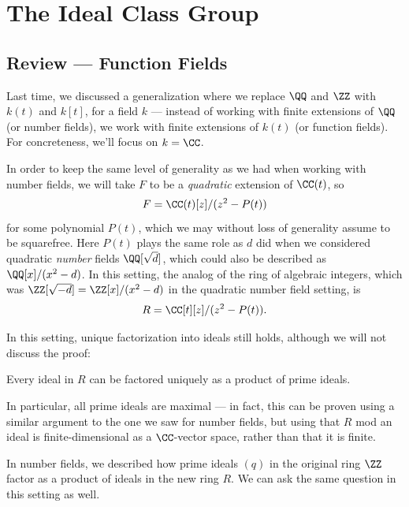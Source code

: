 

\section{The Ideal Class Group}

\subsection{Review --- Function Fields}

Last time, we discussed a generalization where we replace $\QQ$ and $\ZZ$ with $k(t)$ and $k[t]$, for a field $k$ --- instead of working with finite extensions of $\QQ$ (or number fields), we work with finite extensions of $k(t)$ (or function fields). For concreteness, we'll focus on $k = \CC$. 

In order to keep the same level of generality as we had when working with number fields, we will take $F$ to be a \emph{quadratic} extension of $\CC(t)$, so \[F = \CC(t)[z]/(z^2 - P(t))\] for some polynomial $P(t)$, which we may without loss of generality assume to be squarefree. Here $P(t)$ plays the same role as $d$ did when we considered quadratic \emph{number} fields $\QQ[\sqrt{d}]$, which could also be described as $\QQ[x]/(x^2 - d)$. In this setting, the analog of the ring of algebraic integers, which was $\ZZ[\sqrt{-d}] = \ZZ[x]/(x^2 - d)$ in the quadratic number field setting, is \[R = \CC[t][z]/(z^2 - P(t)).\] 

In this setting, unique factorization into ideals still holds, although we will not discuss the proof:

\begin{theorem}
    Every ideal in $R$ can be factored uniquely as a product of prime ideals. 
\end{theorem}

In particular, all prime ideals are maximal --- in fact, this can be proven using a similar argument to the one we saw for number fields, but using that $R$ mod an ideal is finite-dimensional as a $\CC$-vector space, rather than that it is finite. 

In number fields, we described how prime ideals $(q)$ in the original ring $\ZZ$ factor as a product of ideals in the new ring $R$. We can ask the same question in this setting as well.

